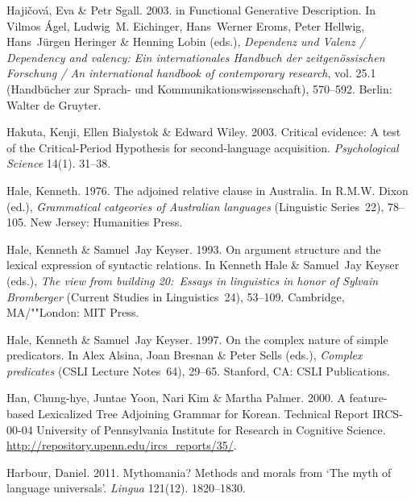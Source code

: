 \begin{thebibliography}{1420}
Haji{\v c}ov{\'a}, Eva \& Petr Sgall. 2003.
 in {Functional Generative Description}.
\newblock In Vilmos {\'A}gel, Ludwig~M. Eichinger, Hans~Werner Eroms, Peter
  Hellwig, Hans~J{\"u}rgen Heringer \& Henning Lobin (eds.), \emph{{Dependenz
  und Valenz} / {Dependency} and valency: {Ein internationales Handbuch der
  zeitgen{\"o}ssischen Forschung} / {An} international handbook of contemporary
  research}, vol. 25.1  (Hand\-b{\"u}\-cher zur Sprach- und
  Kommunikationswissenschaft), 570--592. Berlin: Walter de Gruyter.

Hakuta, Kenji, Ellen Bialystok \& Edward Wiley. 2003.
\newblock Critical evidence: {A} test of the {Critical-Period Hypothesis} for
  second-language acquisition.
\newblock \emph{Psychological Science} 14(1). 31--38.

Hale, Kenneth. 1976.
\newblock The adjoined relative clause in {Australia}.
\newblock In R.M.W. Dixon (ed.), \emph{Grammatical catgeories of {Australian}
  languages} (Linguistic Series~22), 78--105. New Jersey: Humanities Press.

Hale, Kenneth \& Samuel~Jay Keyser. 1993.
\newblock On argument structure and the lexical expression of syntactic
  relations.
\newblock In Kenneth Hale \& Samuel~Jay Keyser (eds.), \emph{The view from
  building 20:\ {Essays} in linguistics in honor of {Sylvain Bromberger}}
  (Current Studies in Linguistics~24), 53--109. Cambridge, MA/""London: MIT
  Press.

Hale, Kenneth \& Samuel~Jay Keyser. 1997.
\newblock On the complex nature of simple predicators.
\newblock In Alex Alsina, Joan Bresnan \& Peter Sells (eds.), \emph{Complex
  predicates} (CSLI Lecture Notes~64), 29--65. Stanford, CA: CSLI Publications.

Han, {Chung-hye}, Juntae Yoon, Nari Kim \& Martha Palmer. 2000.
\newblock A feature-based {Lexicalized Tree Adjoining Grammar} for {Korean}.
\newblock Technical Report IRCS-00-04 University of Pennsylvania Institute for
  Research in Cognitive Science.
\newblock \urlprefix\url{http://repository.upenn.edu/ircs_reports/35/}.

Harbour, Daniel. 2011.
\newblock Mythomania? {Methods} and morals from `{The} myth of language
  universals'.
\newblock \emph{Lingua} 121(12). 1820--1830.


\end{thebibliography}
